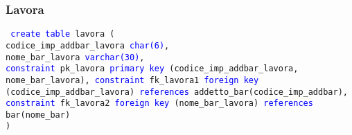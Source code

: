 \documentclass{article}
\begin{document}
    \subsubsection{Lavora}
    \begin{flushleft}
        \texttt{
        \textcolor{blue}{create table} lavora ( \\
        \hspace*{2em} codice\_imp\_addbar\_lavora \hspace*{3em} \textcolor{blue}{char(6)}, \\
        \hspace*{2em} nome\_bar\_lavora \hspace*{7.5em} \textcolor{blue}{varchar(30)}, \\
        \hspace*{2em} \textcolor{blue}{constraint} pk\_lavora \textcolor{blue}{primary key} (codice\_imp\_addbar\_lavora, nome\_bar\_lavora),
        \hspace*{2em} \textcolor{blue}{constraint} fk\_lavora1 \textcolor{blue}{foreign key} (codice\_imp\_addbar\_lavora) \textcolor{blue}{references} \hspace*{2.5em}addetto\_bar(codice\_imp\_addbar), \\
        \hspace*{2em} \textcolor{blue}{constraint} fk\_lavora2 \textcolor{blue}{foreign key} (nome\_bar\_lavora) \textcolor{blue}{references} bar(nome\_bar)\\)}
    \end{flushleft}
\end{document}
